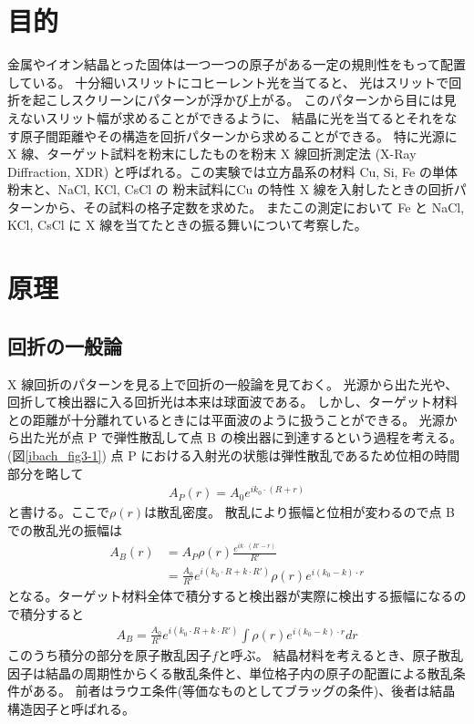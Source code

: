 \documentclass[11pt,dvipdfmx,a4paper]{jsarticle}
\begin{document}
\section{目的}
金属やイオン結晶とった固体は一つ一つの原子がある一定の規則性をもって配置している。
十分細いスリットにコヒーレント光を当てると、
光はスリットで回折を起こしスクリーンにパターンが浮かび上がる。
このパターンから目には見えないスリット幅が求めることができるように、
結晶に光を当てるとそれをなす原子間距離やその構造を回折パターンから求めることができる。
特に光源に X 線、ターゲット試料を粉末にしたものを粉末 X 線回折測定法 (X-Ray Diffraction, XDR)
と呼ばれる。この実験では立方晶系の材料 Cu, Si, Fe の単体粉末と、NaCl, KCl, CsCl の
粉末試料にCu の特性 X 線を入射したときの回折パターンから、その試料の格子定数を求めた。
またこの測定において Fe と NaCl, KCl, CsCl に X 線を当てたときの振る舞いについて考察した。

\section{原理}
\subsection{回折の一般論}
X 線回折のパターンを見る上で回折の一般論を見ておく。
光源から出た光や、回折して検出器に入る回折光は本来は球面波である。
しかし、ターゲット材料との距離が十分離れているときには平面波のように扱うことができる。
光源から出た光が点 P で弾性散乱して点 B の検出器に到達するという過程を考える。(図\ref{ibach_fig3-1})
点 P における入射光の状態は弾性散乱であるため位相の時間部分を略して
\begin{align}
	A_P(r) = A_0e^{ik_0\cdot(R+r)}
\end{align}
と書ける。ここで\(\rho(r)\)は散乱密度。%
散乱により振幅と位相が変わるので点 B での散乱光の振幅は
\begin{align}
	A_B(r) &= A_P \rho(r) \frac{e^{ik\cdot(R'-r)}}{R'}\\
	&=\frac{A_0}{R'}e^{i(k_0 \cdot R+ k \cdot R')}\rho(r)e^{i(k_0-k)\cdot r}
\end{align}
となる。ターゲット材料全体で積分すると検出器が実際に検出する振幅になるので積分すると
\begin{align}
	A_B =\frac{A_0}{R'}e^{i(k_0 \cdot R+ k \cdot R')}\int \rho(r) e^{i(k_0-k)\cdot r} dr
\end{align}
このうち積分の部分を原子散乱因子\(f\)と呼ぶ。
結晶材料を考えるとき、原子散乱因子は結晶の周期性からくる散乱条件と、単位格子内の原子の配置による散乱条件がある。
前者はラウエ条件(等価なものとしてブラッグの条件)、後者は結晶構造因子と呼ばれる。
\end{document}
